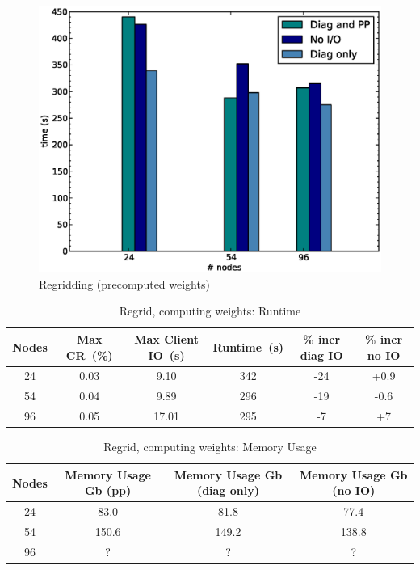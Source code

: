 \begin{figure}[ht!]
  \begin{center}
   \includegraphics[scale=0.4]{figs/regrid_pcw.eps}
   \caption{Regridding (precomputed weights)}
   \label{fig:fig3}
  \end{center}
\end{figure}

\begin{table}[ht!]
\scriptsize
  \begin{center}
    \caption{Regrid, computing weights: Runtime}
    \label{tab:table5}
     \begin{tabular}{|c|c|c|c|c|c|}
      \textbf{Nodes} & \textbf{Max CR~(\%)} & \textbf{Max Client IO~(s)} & \textbf{Runtime~(s)} & \textbf{\% incr diag IO} & \textbf{\% incr no IO}\\
      \hline
      24 & 0.03 & 9.10 & 342 & -24 & +0.9 \\ 
      54 & 0.04 & 9.89 & 296 & -19 & -0.6 \\
      96 & 0.05 & 17.01 & 295 & -7 & +7 \\
    \end{tabular}
  \end{center}
\end{table}

\begin{table}[ht!]
\scriptsize
  \begin{center}
    \caption{Regrid, computing weights: Memory Usage}
    \label{tab:table6}
     \begin{tabular}{|c|c|c|c|}
      \textbf{Nodes} & \textbf{Memory Usage Gb (pp) } & \textbf{Memory Usage Gb (diag only)} & \textbf{Memory Usage Gb (no IO)} \\
      \hline
      24 & 83.0 & 81.8 & 77.4 \\
      54 & 150.6 & 149.2 & 138.8 \\
      96 & ? & ? & ? \\
    \end{tabular}
  \end{center}
\end{table}

